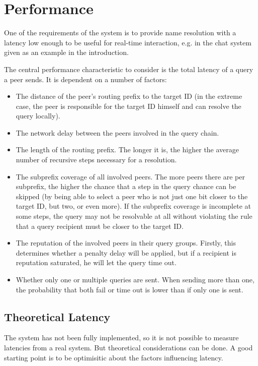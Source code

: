 \chapter{Performance}
\label{chap:performance}
One of the requirements of the system is to provide name resolution with a
latency low enough to be useful for real-time interaction, e.g. in the chat
system given as an example in the introduction.

The central performance characteristic to consider is the total latency of a
query a peer sends. It is dependent on a number of factors:

\begin{itemize}
\item The distance of the peer's routing prefix to the target ID (in the extreme
case, the peer is responsible for the target ID himself and can resolve the
query locally).
\item The network delay between the peers involved in the query chain.
\item The length of the routing prefix. The longer it is, the higher the average
number of recursive steps necessary for a resolution.
\item The subprefix coverage of all involved peers. The more peers there are per
subprefix, the higher the chance that a step in the query chance can be skipped
(by being able to select a peer who is not just one bit closer to the target ID,
but two, or even more). If the subprefix coverage is incomplete at some steps,
the query may not be resolvable at all without violating the rule that a query
recipient must be closer to the target ID.
\item The reputation of the involved peers in their query groups. Firstly, this
determines whether a penalty delay will be applied, but if a recipient is
reputation saturated, he will let the query time out.
\item Whether only one or multiple queries are sent. When sending more than one,
the probability that both fail or time out is lower than if only one is sent.
\end{itemize}

\section{Theoretical Latency}
The system has not been fully implemented, so it is not possible to measure
latencies from a real system. But theoretical considerations can be done. A good
starting point is to be optimisitic about the factors influencing latency.

